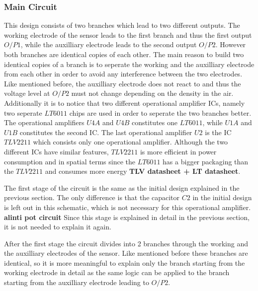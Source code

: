 \subsubsection{Main Circuit}
This design consists of two branches which lead to two different outputs. The working electrode of the sensor leads to the first branch and thus the first output $O/P1$, while the auxilliary electrode leads to the second output $O/P2$. However both branches are identical copies of each other. The main reason to build two identical copies of a branch is to seperate the working and the auxilliary electrode from each other in order to avoid any interference between the two electrodes. Like mentioned before, the auxilliary electrode does not react to  and thus the voltage level at $O/P2$ must not change depending on the  density in the air. Additionally it is to notice that two different operational amplifier ICs, namely two seperate $LT6011$ chips are used in order to seperate the two branches better. The operational amplifiers $U4A$ and $U4B$ constitutes one $LT6011$, while $U1A$ and $U1B$ constitutes the second IC. The last operational amplifier $U2$ is the IC $TLV2211$ which consists only one operational amplifier. Although the two different ICs have similar features, $TLV2211$ is more efficient in power consumption and in spatial terms since the $LT6011$ has a bigger packaging than the $TLV2211$ and consumes more energy \textbf{TLV datasheet + LT datasheet}.\par
The first stage of the circuit is the same as the initial design explained in the previous section. The only difference is that the capacitor $C2$ in the initial design is left out in this schematic, which is not necessary for this operational amplifier. \textbf{alinti pot circuit} Since this stage is explained in detail in the previous section, it is not needed to explain it again. \par 
After the first stage the circuit divides into 2 branches through the working and the auxilliary electrodes of the sensor. Like mentioned before these branches are identical, so it is more meaningful to explain only the branch starting from the working electrode in detail as the same logic can be applied to the branch starting from the auxilliary electrode leading to $O/P2$.\par
